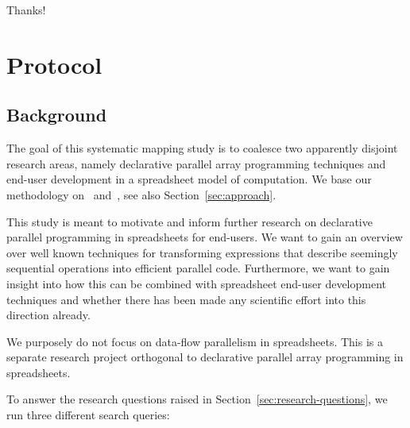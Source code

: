 \documentclass[a4paper]{article}
\begin{document}

Thanks!




\appendix

\newpage{}

\section{Protocol}
\label{sec:protocol}

\subsection{Background}
\label{sec:background}

The goal of this systematic mapping study is to coalesce two apparently disjoint research areas, namely declarative parallel array programming techniques and end-user development in a spreadsheet model of computation. We base our methodology on~\citet{keele2007guidelines}
and~\citet{petersen2008systematic}, see also Section~\ref{sec:approach}.

This study is meant to motivate and inform further research on declarative parallel programming in spreadsheets for end-users. We want to gain an overview over well known techniques for transforming expressions that describe seemingly sequential operations into efficient parallel code. Furthermore, we want to gain insight into how this can be combined with spreadsheet end-user development techniques and whether there has been made any scientific effort into this direction already.

We purposely do not focus on data-flow parallelism in spreadsheets. This is a separate research project orthogonal to declarative parallel array programming in spreadsheets.

To answer the research questions raised in Section~\ref{sec:research-questions}, we run three different search queries:
\end{document}
